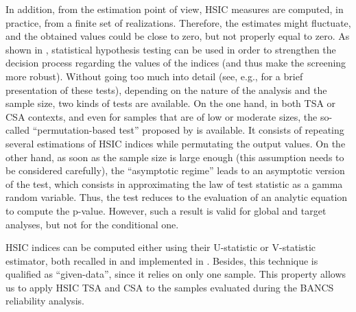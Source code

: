 In addition, from the estimation point of view, HSIC measures are computed, in practice, from a finite set of realizations. 
Therefore, the estimates might fluctuate, and the obtained values could be close to zero, but not properly equal to zero. 
As shown in \citet{delozzo_2016_hsic_test}, statistical hypothesis testing can be used in order to strengthen the decision process regarding the values of the indices (and thus make the screening more robust). 
Without going too much into detail (see, e.g., \citealp{chabridon_iooss_marrel_2020} for a brief presentation of these tests), depending on the nature of the analysis and the sample size, two kinds of tests are available. 
On the one hand, in both TSA or CSA contexts, and even for samples that are of low or moderate sizes, the so-called ``permutation-based test'' proposed by \citet{delozzo_2016_hsic_test} is available. 
It consists of repeating several estimations of HSIC indices while permutating the output values. 
On the other hand, as soon as the sample size is large enough (this assumption needs to be considered carefully), the ``asymptotic regime'' leads to an asymptotic version of the test, which consists in approximating the law of test statistic as a gamma random variable. 
Thus, the test reduces to the evaluation of an analytic equation to compute the p-value. 
However, such a result is valid for global and target analyses, but not for the conditional one.

HSIC indices can be computed either using their U-statistic or V-statistic estimator, both recalled in \citet{marrel_chabridon_2021} and implemented in \ot.
Besides, this technique is qualified as ``given-data'', since it relies on only one sample. 
This property allows us to apply HSIC TSA and CSA to the samples evaluated during the BANCS reliability analysis.



